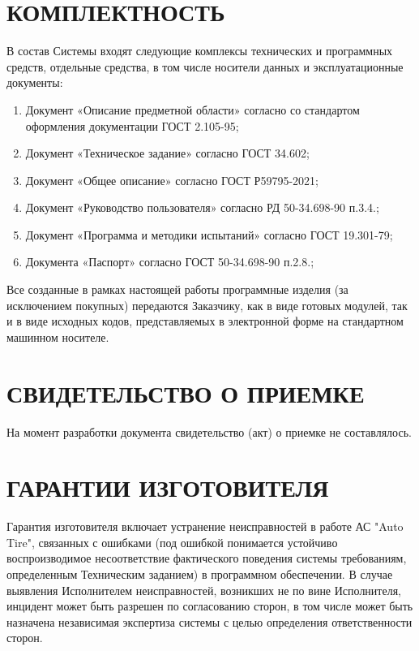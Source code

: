 \documentclass[russian, utf8, 12pt,pointsubsection,floatsubsection]{eskdtext}
\begin{document}
\section{КОМПЛЕКТНОСТЬ} 
В состав Системы входят следующие комплексы технических и программных средств,
отдельные средства, в том числе носители данных и эксплуатационные документы:
\begin{enumerate}
    \item Документ «Описание предметной области» согласно со стандартом оформления документации ГОСТ 2.105-95;
    \item Документ «Техническое задание» согласно ГОСТ 34.602;
    \item Документ «Общее описание» согласно ГОСТ Р59795-2021;
    \item Документ «Руководство пользователя» согласно РД 50-34.698-90 п.3.4.;
    \item Документ «Программа и методики испытаний» согласно ГОСТ 19.301-79;
    \item Документа «Паспорт» согласно ГОСТ 50-34.698-90 п.2.8.;
\end{enumerate}

Все созданные в рамках настоящей работы программные изделия (за исключением покупных) передаются Заказчику, как в виде готовых модулей, так и в виде исходных кодов, представляемых в электронной форме на стандартном машинном носителе.\\

\section{СВИДЕТЕЛЬСТВО О ПРИЕМКЕ}
На момент разработки документа свидетельство (акт) о приемке не составлялось.


\section{ГАРАНТИИ ИЗГОТОВИТЕЛЯ} 
Гарантия изготовителя включает устранение неисправностей в работе АС "Auto Tire", связанных
с ошибками (под ошибкой понимается устойчиво воспроизводимое несоответствие фактического
поведения системы требованиям, определенным Техническим заданием) в программном
обеспечении. В случае выявления Исполнителем неисправностей, возникших не по вине
Исполнителя, инцидент может быть разрешен по согласованию сторон, в том числе может быть
назначена независимая экспертиза системы с целью определения ответственности сторон.\\
\end{document}
